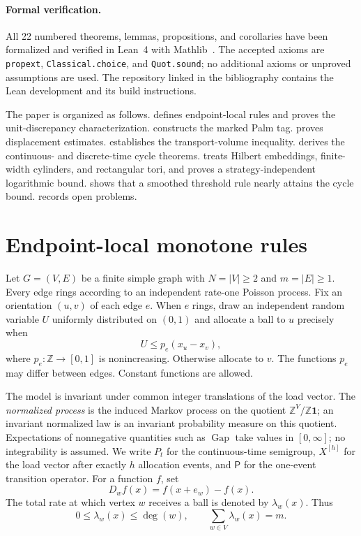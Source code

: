 \documentclass[11pt]{article}
\theoremstyle{remark}
\newcommand{\Z}{\mathbb{Z}}
\newcommand{\Gap}{\operatorname{Gap}}
\begin{document}
\paragraph{Formal verification.}
All 22 numbered theorems, lemmas, propositions, and corollaries have been formalized and verified in Lean~4 with Mathlib~\cite{OkechukwuLean2026}. The accepted axioms are \texttt{propext}, \texttt{Classical.choice}, and \texttt{Quot.sound}; no additional axioms or unproved assumptions are used. The repository linked in the bibliography contains the Lean development and its build instructions.

The paper is organized as follows.  defines endpoint-local rules and proves the unit-discrepancy characterization.  constructs the marked Palm tag.  proves displacement estimates.  establishes the transport-volume inequality.  derives the continuous- and discrete-time cycle theorems.  treats Hilbert embeddings, finite-width cylinders, and rectangular tori, and proves a strategy-independent logarithmic bound.  shows that a smoothed threshold rule nearly attains the cycle bound.  records open problems.

\section{Endpoint-local monotone rules}\label{sec:rules}

Let $G=(V,E)$ be a finite simple graph with $N=|V|\ge2$ and $m=|E|\ge1$. Every edge rings according to an independent rate-one Poisson process. Fix an orientation $(u,v)$ of each edge $e$. When $e$ rings, draw an independent random variable $U$ uniformly distributed on $(0,1)$ and allocate a ball to $u$ precisely when
\[
 U\le p_e(x_u-x_v),
\]
where $p_e:\Z\to[0,1]$ is nonincreasing. Otherwise allocate to $v$. The functions $p_e$ may differ between edges. Constant functions are allowed.

The model is invariant under common integer translations of the load vector. The \emph{normalized process} is the induced Markov process on the quotient $\Z^V/\Z\mathbf{1}$; an invariant normalized law is an invariant probability measure on this quotient. Expectations of nonnegative quantities such as $\Gap$ take values in $[0,\infty]$; no integrability is assumed. We write $P_t$ for the continuous-time semigroup, $X^{[h]}$ for the load vector after exactly $h$ allocation events, and $\mathsf P$ for the one-event transition operator. For a function $f$, set
\[
 D_w f(x)=f(x+e_w)-f(x).
\]
The total rate at which vertex $w$ receives a ball is denoted by $\lambda_w(x)$. Thus
\[
 0\le \lambda_w(x)\le \deg(w),
 \qquad
 \sum_{w\in V}\lambda_w(x)=m.
 \tag{2.1}\label{eq:rates}
\]
\end{document}
